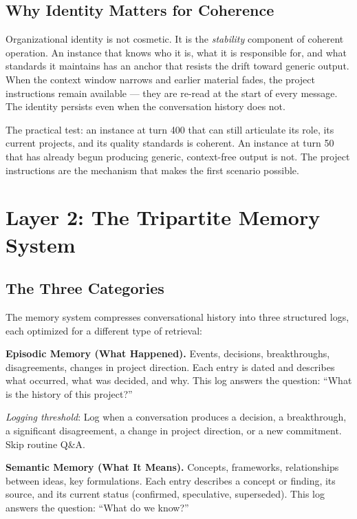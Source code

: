 \documentclass[11pt,a4paper]{article}
\begin{document}
\subsection{Why Identity Matters for Coherence}

Organizational identity is not cosmetic. It is the \textit{stability} component of coherent operation. An instance that knows who it is, what it is responsible for, and what standards it maintains has an anchor that resists the drift toward generic output. When the context window narrows and earlier material fades, the project instructions remain available --- they are re-read at the start of every message. The identity persists even when the conversation history does not.

The practical test: an instance at turn 400 that can still articulate its role, its current projects, and its quality standards is coherent. An instance at turn 50 that has already begun producing generic, context-free output is not. The project instructions are the mechanism that makes the first scenario possible.


\section{Layer 2: The Tripartite Memory System}

\subsection{The Three Categories}

The memory system compresses conversational history into three structured logs, each optimized for a different type of retrieval:

\textbf{Episodic Memory (What Happened).} Events, decisions, breakthroughs, disagreements, changes in project direction. Each entry is dated and describes what occurred, what was decided, and why. This log answers the question: ``What is the history of this project?''

\textit{Logging threshold}: Log when a conversation produces a decision, a breakthrough, a significant disagreement, a change in project direction, or a new commitment. Skip routine Q\&A.

\textbf{Semantic Memory (What It Means).} Concepts, frameworks, relationships between ideas, key formulations. Each entry describes a concept or finding, its source, and its current status (confirmed, speculative, superseded). This log answers the question: ``What do we know?''
\end{document}
